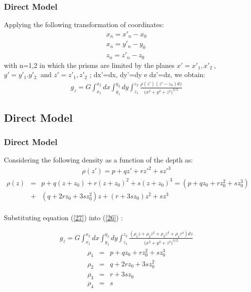 \documentclass{beamer}
\begin{document}
\begin{frame}
\frametitle{Direct Model}
Applying the following transformation of coordinates:
\begin{eqnarray}
x_n = x'_n - x_0 \\
x_n = y'_n - y_0 \\
z_n = z'_n - z_0 \label{25}
\label{22}
\end{eqnarray}
with n=1,2 in which the prisms are limited by the planes $x'=x'_1,x'_2 ~$, $y'=y'_1.y'_2 ~$ and $z'=z'_1,z'_2$ ; dx'=dx, dy'=dy e dz'=dz, we obtain:
\begin{eqnarray}
g_z= G \int_{x_1}^{x_2}dx \int_{y_1}^{y_2}dy \int_{z_1}^{z_2} \frac{\rho(z')(z'-z_0)dz}{ ({x^2 + y^2 + z^2)} ^{3/2} } \label{26}
\end{eqnarray}
\end{frame}

\subsection{Direct Model} %

\begin{frame}
\frametitle{Direct Model}
Considering the following density as a function of the depth as:
\begin{eqnarray}
\rho(z')=p+qz'+rz'^2+sz'^3 
\end{eqnarray}
\begin{eqnarray}
\rho(z) &=& p+q(z+z_0)+r(z+z_0)^2+s(z+z_0)^3 = (p + qz_0 + rz_0^2 + sz_0^3) \nonumber \\ &+& (q + 2rz_0 + 3sz_0^2)z + (r + 3sz_0)z^2 + sz^3 \label{27} \nonumber \\
\end{eqnarray}

Substituting equation (\ref{27}) into (\ref{26}) :

 \begin{eqnarray}
 g_z= G \int_{x_1}^{x_2}dx \int_{y_1}^{y_2}dy \int_{z_1}^{z_2} \frac{(\rho_1 z+\rho_2 z^2+\rho_3 z^3+\rho_4 z^4) dz}{ ({x^2 + y^2 + z^2)} ^{3/2}}  \label{28}
 \end{eqnarray}
\begin{eqnarray}
\rho_1 &=& p + qz_0 + rz_0^2 + sz_0^3 \\
\rho_2 &=& q + 2rz_0 + 3sz_0^2  \\ 
\rho_3 &=& r + 3sz_0 \\
\rho_4 &=& s 
\label{29}
\end{eqnarray}
\end{frame}
\end{document}
